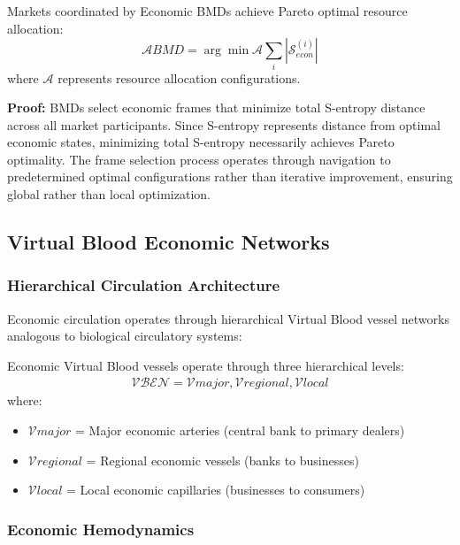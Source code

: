 \begin{theorem}
Markets coordinated by Economic BMDs achieve Pareto optimal resource allocation:
\begin{equation}
\mathcal{A}{BMD} = \arg\min{\mathcal{A}} \sum_{i} |\mathcal{S}_{econ}^{(i)}|
\end{equation}
where $\mathcal{A}$ represents resource allocation configurations.

\textbf{Proof:}
BMDs select economic frames that minimize total S-entropy distance across all market participants. Since S-entropy represents distance from optimal economic states, minimizing total S-entropy necessarily achieves Pareto optimality. The frame selection process operates through navigation to predetermined optimal configurations rather than iterative improvement, ensuring global rather than local optimization.
\end{theorem}

\subsection{Virtual Blood Economic Networks}

\subsubsection{Hierarchical Circulation Architecture}

Economic circulation operates through hierarchical Virtual Blood vessel networks analogous to biological circulatory systems:

\begin{definition}
Economic Virtual Blood vessels operate through three hierarchical levels:
\begin{align}
\mathcal{VBEN} = {\mathcal{V}{major}, \mathcal{V}{regional}, \mathcal{V}{local}}
\end{align}
where:
\begin{itemize}
\item $\mathcal{V}{major}$ = Major economic arteries (central bank to primary dealers)
\item $\mathcal{V}{regional}$ = Regional economic vessels (banks to businesses)
\item $\mathcal{V}{local}$ = Local economic capillaries (businesses to consumers)
\end{itemize}
\end{definition}

\subsubsection{Economic Hemodynamics}

